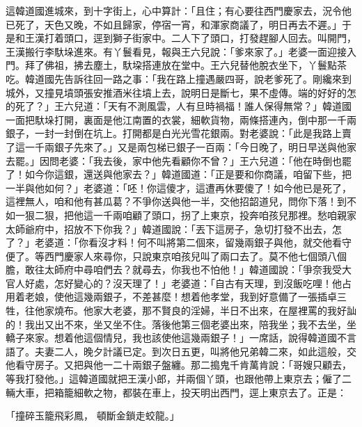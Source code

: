 這韓道國進城來，到十字街上，心中算計：「且住；有心要往西門慶家去，況令他已死了，天色又晚，不如且歸家，停宿一宵，和渾家商議了，明日再去不遲。」于是和王漢打着頭口，逕到獅子街家中。二人下了頭口，打發趕腳人回去。叫開門，王漢搬行李馱垛進來。有丫鬟看見，報與王六兒說：「爹來家了。」老婆一面迎接入門。拜了佛祖，拂去塵土，馱垜搭連放在堂中。王六兒替他脫衣坐下，丫鬟點茶吃。韓道國先告訴往回一路之事：「我在路上撞遇嚴四哥，說老爹死了。剛纔來到城外，又撞見墳頭張安推酒米往墳上去，說明日是斷七，果不虛傳。端的好好的怎的死了？」王六兒道：「天有不測風雲，人有旦時禍福！誰人保得無常？」韓道國一面把馱垛打開，裏面是他江南置的衣裳，細軟貨物，兩條搭連內，倒中那一千兩銀子，一封一封倒在坑上。打開都是白光光雪花銀兩。對老婆說：「此是我路上賣了這一千兩銀子先來了。」又是兩包梯已銀子一百兩：「今日晚了，明日早送與他家去罷。」因問老婆：「我去後，家中他先看顧你不曾？」王六兒道：「他在時倒也罷了！如今你這銀，還送與他家去？」韓道國道：「正是要和你商議，咱留下些，把一半與他如何？」老婆道：「呸！你這傻才，這遭再休要傻了！如今他已是死了，這裡無人，咱和他有甚瓜葛？不爭你送與他一半，交他招韶道兒，問你下落！到不如一狠二狠，把他這一千兩咱顧了頭口，拐了上東京，投奔咱孩兒那裡。愁咱親家太師爺府中，招放不下你我？」韓道國說：「丟下這房子，急切打發不出去，怎了？」老婆道：「你看沒才料！何不叫將第二個來，留幾兩銀子與他，就交他看守便了。等西門慶家人來尋你，只說東京咱孩兒叫了兩口去了。莫不他七個頭八個膽，敢往太師府中尋咱們去？就尋去，你我也不怕他！」韓道國說：「爭奈我受大官人好處，怎好變心的？沒天理了！」老婆道：「自古有天理，到沒飯吃哩！他占用着老娘，使他這幾兩銀子，不差甚麼！想着他孝堂，我到好意備了一張插卓三牲，往他家燒布。他家大老婆，那不賢良的淫婦，半日不出來，在屋裡罵的我好訕的！我出又出不來，坐又坐不住。落後他第三個老婆出來，陪我坐；我不去坐，坐轎子來家。想着他這個情兒，我也該使他這幾兩銀子！」一席話，說得韓道國不言語了。夫妻二人，晚夕計議已定。到次日五更，叫將他兄弟韓二來，如此這般，交他看守房子。又把與他一二十兩銀子盤纏。那二搗鬼千肯萬肯說：「哥嫂只顧去，等我打發他。」這韓道國就把王漢小郎，并兩個丫頭，也跟他帶上東京去；僱了二輛大車，把箱籠細軟之物，都裝在車上，投天明出西門，逕上東京去了。正是：

「撞碎玉籠飛彩鳳，  頓斷金鎖走蛟龍。」

